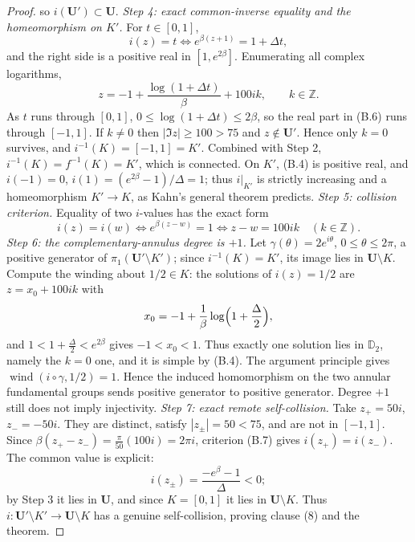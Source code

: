 \begin{proof}
so \(i(\mathbf U')\subset\mathbf U\).
\emph{Step 4: exact common-inverse equality and the homeomorphism on \(K'\).} For \(t\in[0,1]\),
\[ i(z)=t\iff e^{\beta(z+1)}=1+\Delta t, \]
and the right side is a positive real in \([1,e^{2\beta}]\). Enumerating all complex logarithms,
\[ z=-1+\frac{\log(1+\Delta t)}{\beta}+100ik,\qquad k\in\mathbb Z. \tag{B.6} \]
As \(t\) runs through \([0,1]\), \(0\le\log(1+\Delta t)\le2\beta\), so the real part in (B.6) runs through \([-1,1]\). If \(k\ne0\) then \(|\Im z|\ge100>75\) and \(z\notin\mathbf U'\). Hence only \(k=0\) survives, and \(i^{-1}(K)=[-1,1]=K'\). Combined with Step 2, \(i^{-1}(K)=f^{-1}(K)=K'\), which is connected. On \(K'\), (B.4) is positive real, and \(i(-1)=0\), \(i(1)=(e^{2\beta}-1)/\Delta=1\); thus \(i|_{K'}\) is strictly increasing and a homeomorphism \(K'\to K\), as Kahn's general theorem predicts.
\emph{Step 5: collision criterion.} Equality of two \(i\)-values has the exact form
\[ i(z)=i(w)\iff e^{\beta(z-w)}=1\iff z-w=100ik\quad(k\in\mathbb Z). \tag{B.7} \]
\emph{Step 6: the complementary-annulus degree is \(+1\).} Let \(\gamma(\theta)=2e^{i\theta}\), \(0\le\theta\le2\pi\), a positive generator of \(\pi_1(\mathbf U'\setminus K')\); since \(i^{-1}(K)=K'\), its image lies in \(\mathbf U\setminus K\). Compute the winding about \(1/2\in K\): the solutions of \(i(z)=1/2\) are \(z=x_0+100ik\) with
\[ x_0=-1+\frac{1}{\beta}\log\Bigl(1+\frac{\Delta}{2}\Bigr), \]
and \(1<1+\tfrac{\Delta}{2}<e^{2\beta}\) gives \(-1<x_0<1\). Thus exactly one solution lies in \(\mathbb D_2\), namely the \(k=0\) one, and it is simple by (B.4). The argument principle gives \(\operatorname{wind}(i\circ\gamma,1/2)=1\). Hence the induced homomorphism on the two annular fundamental groups sends positive generator to positive generator. Degree \(+1\) still does not imply injectivity.
\emph{Step 7: exact remote self-collision.} Take \(z_{+}=50i\), \(z_{-}=-50i\). They are distinct, satisfy \(|z_{\pm}|=50<75\), and are not in \([-1,1]\). Since \(\beta(z_{+}-z_{-})=\tfrac{\pi}{50}(100i)=2\pi i\), criterion (B.7) gives \(i(z_{+})=i(z_{-})\). The common value is explicit:
\[ i(z_{\pm})=\frac{-e^{\beta}-1}{\Delta}<0; \]
by Step 3 it lies in \(\mathbf U\), and since \(K=[0,1]\) it lies in \(\mathbf U\setminus K\). Thus \(i:\mathbf U'\setminus K'\to\mathbf U\setminus K\) has a genuine self-collision, proving clause (8) and the theorem.
\end{proof}